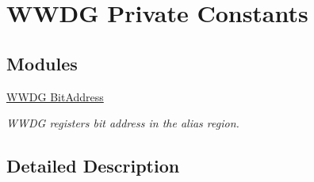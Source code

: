 \hypertarget{group___w_w_d_g___private___constants}{}\section{W\+W\+DG Private Constants}
\label{group___w_w_d_g___private___constants}
\subsection*{Modules}
\begin{DoxyCompactItemize}
\item 
\hyperlink{group___w_w_d_g___bit_address___alias_region}{W\+W\+D\+G Bit\+Address}
\begin{DoxyCompactList}\small\item\em W\+W\+DG registers bit address in the alias region. \end{DoxyCompactList}\end{DoxyCompactItemize}


\subsection{Detailed Description}
